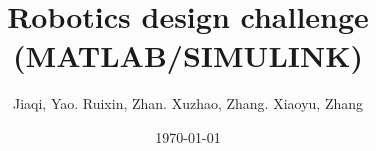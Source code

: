 \documentclass[11pt]{article}
\title{
    Robotics design challenge  \\
    (MATLAB/SIMULINK)}
\author{
	Jiaqi, Yao. Ruixin, Zhan. Xuzhao, Zhang. Xiaoyu, Zhang%
}
\date{
    \today
}
\begin{document}
\maketitle
\begin{abstract}
\end{abstract}
{} %







%
\newpage


%
%
%
\end{document}
